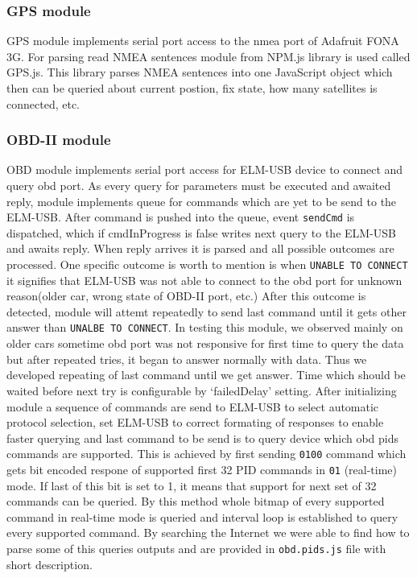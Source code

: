 \subsubsection{GPS module} %
\label{ssub:gps_module}
GPS module implements serial port access to the nmea port of Adafruit FONA 3G. For parsing read NMEA sentences module from NPM.js library is used called GPS.js. This library parses NMEA sentences into one JavaScript object which then can be queried about current postion, fix state, how many satellites is connected, etc.
\subsubsection{OBD-II module} %
\label{ssub:obd_ii_module}
OBD module implements serial port access for ELM-USB device to connect and query \gls{obd} port. As every query for parameters must be executed and awaited reply, module implements queue for commands which are yet to be send to the ELM-USB. After command is pushed into the queue, event \verb|sendCmd| is dispatched, which if cmdInProgress is false writes next query to the ELM-USB and awaits reply. When reply arrives it is parsed and all possible outcomes are processed. One specific outcome is worth to mention is when \verb|UNABLE TO CONNECT| it signifies that ELM-USB was not able to connect to the \gls{obd} port for unknown reason(older car, wrong state of OBD-II port, etc.) After this outcome is detected, module will attemt repeatedly to send last command until it gets other answer than \verb|UNALBE TO CONNECT|. In testing this module, we observed mainly on older cars sometime \gls{obd} port was not responsive for first time to query the data but after repeated tries, it began to answer normally with data. Thus we developed repeating of last command until we get answer. Time which should be waited before next try is configurable by `failedDelay' setting. After initializing module a sequence of commands are send to ELM-USB to select automatic protocol selection, set ELM-USB to correct formating of responses to enable faster querying and last command to be send is to query device which \gls{obd} \gls{pids} commands are supported. This is achieved by first sending \verb|0100| command which gets bit encoded respone of supported first 32 PID commands in \verb|01| (real-time) mode. If last of this bit is set to 1, it means that support for next set of 32 commands can be queried. By this method whole bitmap of every supported command in real-time mode is queried and interval loop is established to query every supported command. By searching the Internet we were able to find how to parse some of this queries outputs and are provided in \verb|obd.pids.js| file with short description.
